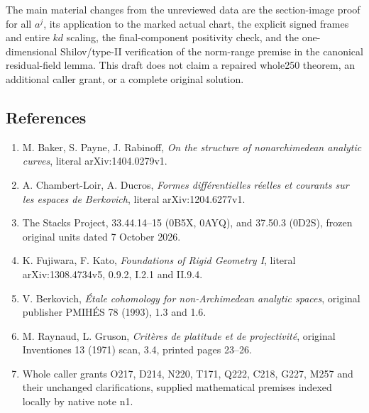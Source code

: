 \documentclass[
  11pt,
]{article}
\providecommand{\tightlist}{%
  \setlength{\itemsep}{0pt}\setlength{\parskip}{0pt}}
\begin{document}
The main material changes from the unreviewed data are the section-image
proof for all \(a^j\), its application to the marked actual chart, the
explicit signed frames and entire \(kd\) scaling, the final-component
positivity check, and the one-dimensional Shilov/type-II verification of
the norm-range premise in the canonical residual-field lemma. This draft
does not claim a repaired whole250 theorem, an additional caller grant,
or a complete original solution.

\subsection{References}\label{references}

\begin{enumerate}
\def\labelenumi{\arabic{enumi}.}
\tightlist
\item
  M. Baker, S. Payne, J. Rabinoff, \emph{On the structure of
  nonarchimedean analytic curves}, literal arXiv:1404.0279v1.
\item
  A. Chambert-Loir, A. Ducros, \emph{Formes différentielles réelles et
  courants sur les espaces de Berkovich}, literal arXiv:1204.6277v1.
\item
  The Stacks Project, 33.44.14--15 (0B5X, 0AYQ), and 37.50.3 (0D2S),
  frozen original units dated 7 October 2026.
\item
  K. Fujiwara, F. Kato, \emph{Foundations of Rigid Geometry I}, literal
  arXiv:1308.4734v5, 0.9.2, I.2.1 and II.9.4.
\item
  V. Berkovich, \emph{Étale cohomology for non-Archimedean analytic
  spaces}, original publisher PMIHÉS 78 (1993), 1.3 and 1.6.
\item
  M. Raynaud, L. Gruson, \emph{Critères de platitude et de
  projectivité}, original Inventiones 13 (1971) scan, 3.4, printed pages
  23--26.
\item
  Whole caller grants O217, D214, N220, T171, Q222, C218, G227, M257 and
  their unchanged clarifications, supplied mathematical premises indexed
  locally by native note n1.
\end{enumerate}
\end{document}
